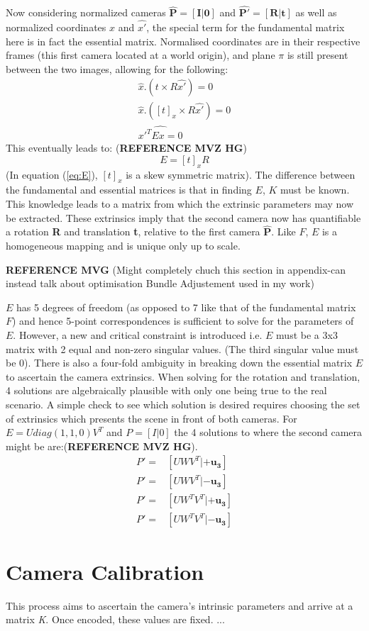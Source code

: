 \documentclass[12pt]{article}
\begin{document}
Now considering normalized cameras $\mathbf{\hat{P} = \left[I|0\right]}$ and $\mathbf{\hat{P'} = \left[R|t\right]}$ as well as normalized coordinates $\hat{x}$ and $\hat{x'}$, the special term for the fundamental matrix here is in fact the essential matrix. Normalised coordinates are in their respective frames (this first camera located at a world origin), and plane $\pi$ is still present between the two images, allowing for the following:
\begin{align*}
\hat{x}.(t \times R\hat{x'}) = 0\\
\hat{x}.(\left[t\right]_x \times R\hat{x'}) = 0\\
\hat{x'^TEx = 0}
\end{align*}
This eventually leads to: (\textbf{REFERENCE MVZ HG})
\begin{equation}
E = \left[t\right]_xR \label{eq:E}
\end{equation}
(In equation (\ref{eq:E}), $\left[t\right]_x$ is a skew symmetric matrix). The difference between the fundamental and essential matrices is that in finding $E$, $K$ must be known. This knowledge leads to a matrix from which the extrinsic parameters may now be extracted. These extrinsics imply that the second camera now has quantifiable a rotation \textbf{R} and translation \textbf{t}, relative to the first camera $\mathbf{\hat{P}}$. Like $F$, $E$ is a homogeneous mapping and is unique only up to scale. 

\textbf{REFERENCE MVG} (Might completely chuch this section in appendix-can instead talk about optimisation Bundle Adjustement used in my work)

$E$ has 5 degrees of freedom (as opposed to 7 like that of the fundamental matrix $F$) and hence 5-point correspondences is sufficient to solve for the parameters of $E$. However, a new and critical constraint is introduced i.e. $E$ must be a 3x3 matrix with 2 equal and non-zero singular values. (The third singular value must be 0). There is also a four-fold ambiguity in breaking down the essential matrix $E$ to ascertain the camera extrinsics. When solving for the rotation and translation, 4 solutions are algebraically plausible with only one being true to the real scenario. A simple check to see which solution is desired requires choosing the set of extrinsics which presents the scene in front of both cameras. For $E = U diag(1,1,0)V^T$ and $P = [I|0]$  the 4 solutions to where the second camera might be are:(\textbf{REFERENCE MVZ HG}).
\begin{align*}
P' = {}&\left[UWV^T | +\mathbf{u_3}\right]\\
P' = {}&\left[UWV^T | -\mathbf{u_3}\right]\\
P' = {}&\left[UW^TV^T | +\mathbf{u_3}\right]\\
P' = {}&\left[UW^TV^T | -\mathbf{u_3}\right]
\end{align*}
\section{Camera Calibration}
This process aims to ascertain the camera's intrinsic parameters and arrive at a matrix \textit{K}. Once encoded, these values are fixed. ...
\end{document}
